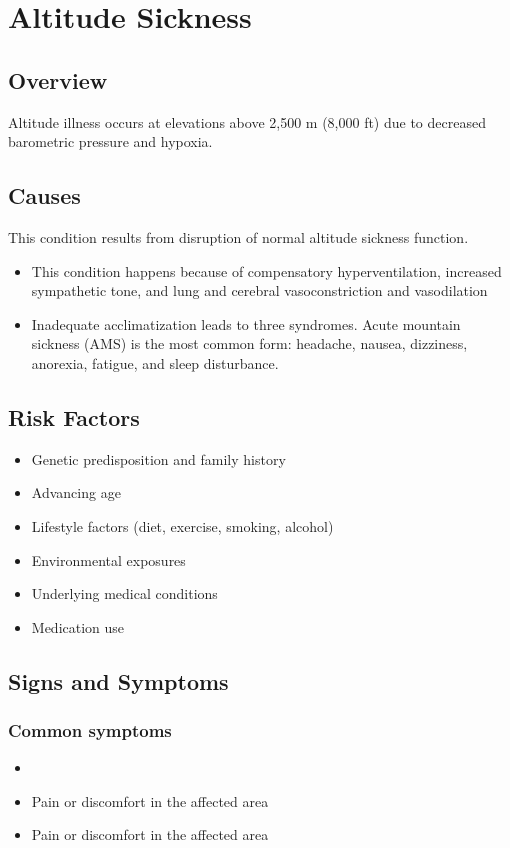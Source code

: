 \chapter{Altitude Sickness}
\label{sec:Altitude Sickness}

\section{Overview}
Altitude illness occurs at elevations above 2,500 m (8,000 ft) due to decreased barometric pressure and hypoxia.
\section{Causes}
This condition results from disruption of normal altitude sickness function.

\begin{itemize}[noitemsep]
  \item This condition happens because of compensatory hyperventilation, increased sympathetic tone, and lung and cerebral vasoconstriction and vasodilation
  \item Inadequate acclimatization leads to three syndromes. Acute mountain sickness (AMS) is the most common form: headache, nausea, dizziness, anorexia, fatigue, and sleep disturbance.
\end{itemize}
\section{Risk Factors}


\begin{itemize}[noitemsep]
  \item Genetic predisposition and family history
  \item Advancing age
  \item Lifestyle factors (diet, exercise, smoking, alcohol)
  \item Environmental exposures
  \item Underlying medical conditions
  \item Medication use
\end{itemize}
\section{Signs and Symptoms}

\subsection{Common symptoms}
\begin{itemize}[noitemsep]
  \item \item Pain or discomfort in the affected area    \item Pain or discomfort in the affected area
  \end{itemize}

